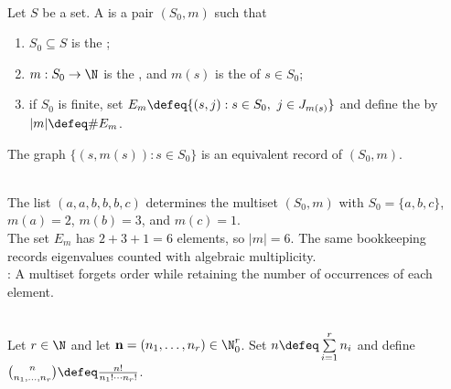 \begin{definition} \label{def:multisets-and-multiplicity} \\
Let $S$ be a set. A  is a pair $(S_0,m)$ such that
\begin{enumerate}[label=(\roman*)]
\setlength{\itemsep}{0pt}
\item $S_0\subseteq S$ is the ;
\item $m:S_0\to\N$ is the , and $m(s)$ is the  of $s\in S_0$;
\item if $S_0$ is finite, set $E_m\defeq\{(s,j):s\in S_0,\ j\in J_{m(s)}\}$ and define the  by $\lvert m\rvert\defeq\#E_m$.
\end{enumerate}
The graph $\{(s,m(s)):s\in S_0\}$ is an equivalent record of $(S_0,m)$.
\end{definition}

\begin{example} \label{ex:multiset-eigenvalue-bookkeeping} \\
The list $(a,a,b,b,b,c)$ determines the multiset $(S_0,m)$ with $S_0=\{a,b,c\}$, $m(a)=2$, $m(b)=3$, and $m(c)=1$.\\
The set $E_m$ has $2+3+1=6$ elements, so $\lvert m\rvert=6$. The same bookkeeping records eigenvalues counted with algebraic multiplicity.\\
: A multiset forgets order while retaining the number of occurrences of each element.\\
\end{example}

\begin{definition} \label{def:multinomial-coefficients} \\
Let $r\in\N$ and let $\mathbf{n}=(n_1,\ldots,n_r)\in\N_0^r$. Set $n\defeq\sum\limits_{i=1}^{r}n_i$ and define $\binom{n}{n_1,\ldots,n_r}\defeq\frac{n!}{n_1!\cdots n_r!}$.
\end{definition}

